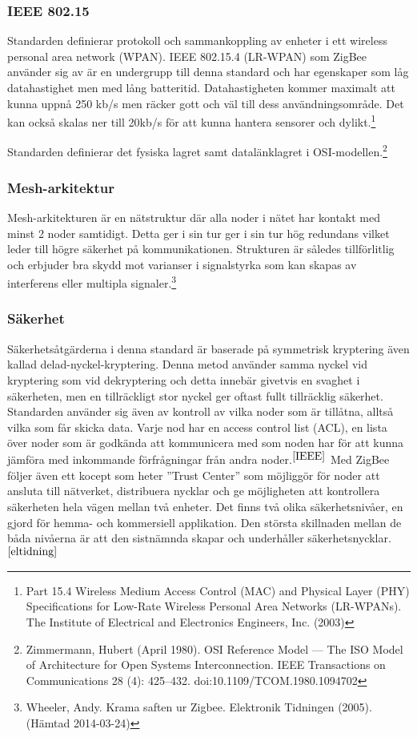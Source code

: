 \documentclass[a4paper,12pt,fleqn]{article}
\begin{document}
\subsubsection{IEEE 802.15}
Standarden definierar protokoll och sammankoppling av enheter i ett wireless personal area network (WPAN). IEEE 802.15.4 (LR-WPAN) som ZigBee använder sig av är en undergrupp till denna standard och har egenskaper som låg datahastighet men med lång batteritid. Datahastigheten kommer maximalt att kunna uppnå 250 kb/s men räcker gott och väl till dess användningsområde. Det kan också skalas ner till 20kb/s för att kunna hantera sensorer och dylikt.\footnote{\label{IEEE} Part 15.4 Wireless Medium Access Control (MAC) and Physical Layer (PHY) Specifications for Low-Rate Wireless Personal Area Networks (LR-WPANs). The Institute of Electrical and Electronics Engineers, Inc. (2003)}


Standarden definierar det fysiska lagret samt datalänklagret i OSI-modellen.\footnote{Zimmermann, Hubert (April 1980). OSI Reference Model — The ISO Model of Architecture for Open Systems Interconnection. IEEE Transactions on Communications 28 (4): 425–432. doi:10.1109/TCOM.1980.1094702} 


\subsubsection{Mesh-arkitektur}
Mesh-arkitekturen är en nätstruktur där alla noder i nätet har kontakt med minst 2 noder samtidigt. Detta ger i sin tur ger i sin tur hög redundans vilket leder till högre säkerhet på kommunikationen. Strukturen är således tillförlitlig och erbjuder bra skydd mot varianser i signalstyrka som kan skapas av interferens eller multipla signaler.\footnote{\label{eltidning} Wheeler, Andy. Krama saften ur Zigbee. Elektronik Tidningen (2005).(Hämtad 2014-03-24)}

\subsubsection{Säkerhet}
Säkerhetsåtgärderna i denna standard är baserade på symmetrisk kryptering även kallad delad-nyckel-kryptering. Denna metod använder samma nyckel vid kryptering som vid dekryptering och detta innebär givetvis en svaghet i säkerheten, men en tillräckligt stor nyckel ger oftast fullt tillräcklig säkerhet. 
Standarden använder sig även av kontroll av vilka noder som är tillåtna, alltså vilka som får skicka data. Varje nod har en access control list (ACL), en lista över noder som är godkända att kommunicera med som noden har för att kunna jämföra med inkommande förfrågningar från andra noder.$^{\ref{IEEE}}$ 
Med ZigBee följer även ett kocept som heter ''Trust Center'' som möjliggör för noder att ansluta till nätverket, distribuera nycklar och ge möjligheten att kontrollera säkerheten hela vägen mellan två enheter. Det finns två olika säkerhetsnivåer, en gjord för hemma- och kommersiell applikation. Den största skillnaden mellan de båda nivåerna är att den sistnämnda skapar och underhåller säkerhetsnycklar.$^{\ref{eltidning}}$ 
\end{document}
